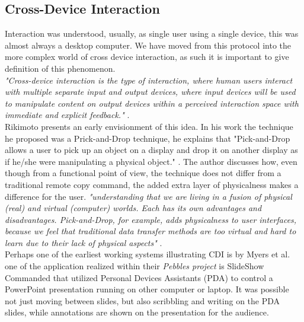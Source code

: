 \subsection{Cross-Device Interaction}
Interaction was understood, usually, as single user using a single device, this was almost always a desktop computer\cite{Levin:2014}. We have moved from this protocol into the more complex world of cross device interaction, as such it is important to give definition of this phenomenon.\\

\emph{"Cross-device interaction is the type of interaction, where human users interact with multiple separate input and output devices, where input devices will be used to manipulate content on output devices within a perceived interaction space with immediate and explicit feedback."} \cite{Scharf:2013}.\\

Rikimoto presents an early envisionment of this idea. In his work the technique he proposed was a Prick-and-Drop technique, he explains that "Pick-and-Drop allows a user to pick up an object on a display and drop it on another display as if he/she were manipulating a physical object." \cite{Rekimoto:1997}. The author discusses how, even though from a functional point of view, the technique does not differ from a traditional remote copy command, the added extra layer of physicalness makes a difference for the user. \emph{"understanding that we are living in a fusion of physical (real) and virtual (computer) worlds. Each has its own advantages and disadvantages. Pick-and-Drop, for example, adds physicalness to user interfaces, because we feel that traditional data transfer methods are too virtual and hard to learn due to their lack of physical aspects"} \cite{Rekimoto:1997}.\\

Perhaps one of the earliest working systems illustrating CDI is by Myers et al.
\cite{Myers:2001} one of the application realized within their \emph{Pebbles project} is SlideShow Commanded that utilized Personal Devices Assistants (PDA) to control a PowerPoint presentation running on other computer or laptop.
It was possible not just moving between slides, but also scribbling and writing on the PDA slides, while annotations are shown on the presentation for the audience.\\


